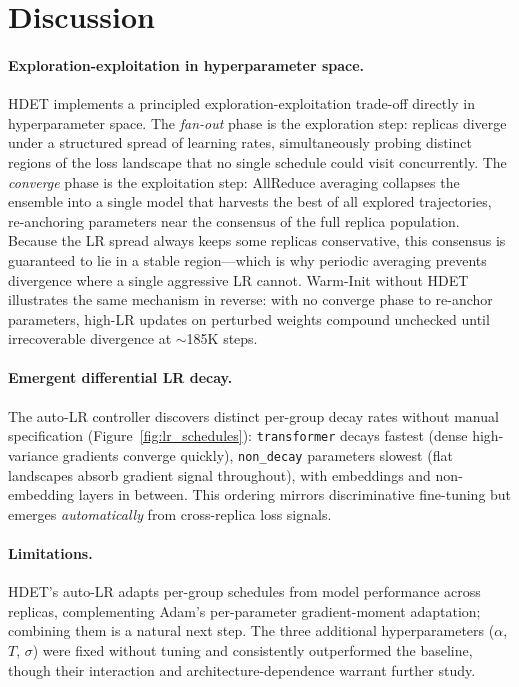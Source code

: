 \documentclass{article}
\begin{document}
\section{Discussion}
\label{sec:discussion}

\paragraph{Exploration-exploitation in hyperparameter space.}
HDET implements a principled exploration-exploitation trade-off directly in
hyperparameter space.
The \emph{fan-out} phase is the exploration step: replicas diverge under a structured
spread of learning rates, simultaneously probing distinct regions of the loss landscape
that no single schedule could visit concurrently.
The \emph{converge} phase is the exploitation step: AllReduce averaging collapses the
ensemble into a single model that harvests the best of all explored trajectories,
re-anchoring parameters near the consensus of the full replica population.
Because the LR spread always keeps some replicas conservative, this consensus is
guaranteed to lie in a stable region---which is why periodic averaging prevents
divergence where a single aggressive LR cannot.
Warm-Init without HDET illustrates the same mechanism in reverse: with no converge
phase to re-anchor parameters, high-LR updates on perturbed weights compound
unchecked until irrecoverable divergence at $\sim$185K steps.

\paragraph{Emergent differential LR decay.}
The auto-LR controller discovers distinct per-group decay rates without manual
specification (Figure~\ref{fig:lr_schedules}):
\texttt{transformer} decays fastest (dense high-variance gradients converge quickly),
\texttt{non\_decay} parameters slowest (flat landscapes absorb gradient signal
throughout), with embeddings and non-embedding layers in between.
This ordering mirrors discriminative fine-tuning \citep{howard2018universal} but
emerges \emph{automatically} from cross-replica loss signals.

\paragraph{Limitations.}
HDET's auto-LR adapts per-group schedules from model performance across replicas,
complementing Adam's \citep{kingma2014adam} per-parameter gradient-moment adaptation; combining them is a
natural next step.
The three additional hyperparameters ($\alpha$, $T$, $\sigma$) were fixed without
tuning and consistently outperformed the baseline, though their interaction and
architecture-dependence warrant further study.
\end{document}
